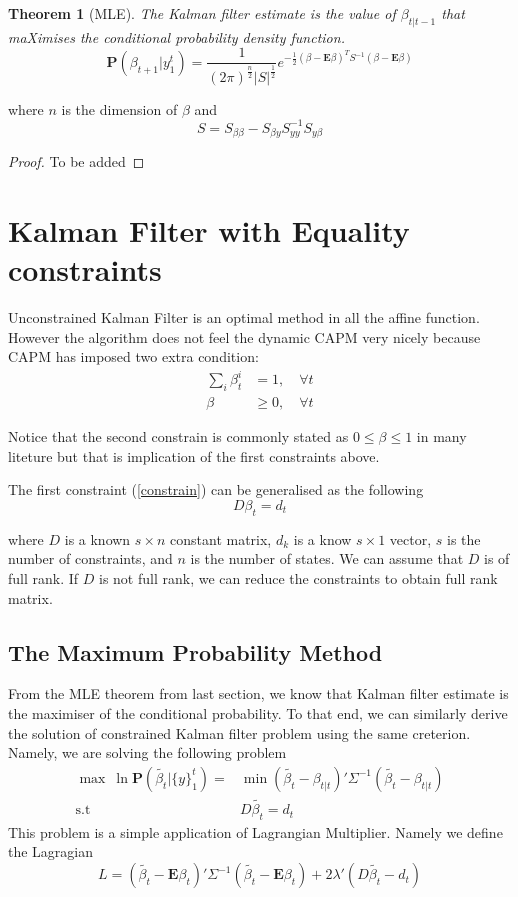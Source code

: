 \documentclass{article}
\numberwithin{algorithm}{section}
\theoremstyle{plain}
\newtheorem{thm}{Theorem}[section]
\theoremstyle{definition}
\theoremstyle{remark}
\newcommand{\E}{\mathbf{E}}
\newcommand{\PP}{\mathbf{P}}
\begin{document}
\begin{thm}[MLE]
The Kalman filter estimate is the value of $\beta_{t|t-1}$ that maXimises the conditional probability density function.
\[
\PP(\beta_{t+1} | y_1^t) = \frac1{(2\pi)^\frac n2 |S|^{\frac12}} e^{-\frac12(\beta - \E \beta)^T S^{-1} (\beta - \E \beta)}
\]
\end{thm}
where $n$ is the dimension of $\beta$ and 
\[
S = S_{\beta \beta} - S_{\beta y} S^{-1}_{y y} S_{y\beta }
\] 
\begin{proof}
To be added
\end{proof}


\section{Kalman Filter with Equality constraints}

Unconstrained Kalman Filter is an optimal method in all the affine function. However the algorithm does not feel the dynamic CAPM very nicely because CAPM has imposed two extra condition:
\begin{equation}
\begin{split}
\sum_{i} \beta^i_t &= 1, \quad \forall t\\
\beta &\geq 0, \quad \forall t
\end{split}
\label{constrain}
\end{equation}

Notice that the second constrain is commonly stated as $0 \leq \beta \leq 1$ in many liteture but that is implication of the first constraints above. 

The first constraint (\ref{constrain}) can be generalised as the following 
\[
D \beta_t = d_t
\]

where $D$ is a known $s \times n$ constant matrix, $d_k$ is a know $s \times 1$ vector, $s$ is the number of constraints, and $n$ is the number of states. We can assume that $D$ is of full rank. If $D$ is not full rank, we can reduce the constraints to obtain full rank matrix.

\subsection{The Maximum Probability Method}
From the MLE theorem from last section, we know that Kalman filter estimate is the maximiser of the conditional probability. To that end, we can similarly derive the solution of constrained Kalman filter problem using the same creterion. Namely, we are solving the following problem
\begin{equation}
\begin{split}
\max \: \ln \PP(\tilde{\beta_t} | \{y\}^t_1) = &\min (\tilde{\beta_t}  - \beta_{t|t})' \Sigma^{-1} (\tilde{\beta_t}  - \beta_{t|t})\\
\text{s.t }&D\tilde{\beta_t} = d_t
\end{split}
\end{equation}
This problem is a  simple application of Lagrangian Multiplier. Namely we define the Lagragian
\[
L = (\tilde{\beta_t}  - \E{\beta_t})' \Sigma^{-1} (\tilde{\beta_t}  - \E{\beta_t}) + 2 \lambda' (D\tilde{\beta_t} - d_t)
\]
\end{document}
